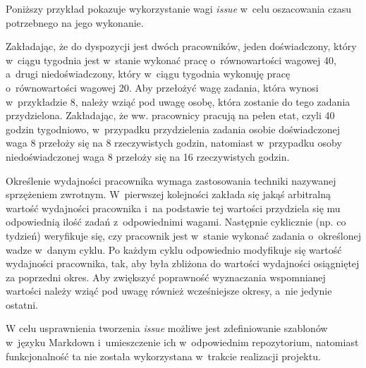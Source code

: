 Poniższy przykład pokazuje wykorzystanie wagi \textit{issue} w~celu oszacowania czasu potrzebnego na jego wykonanie.\par

Zakładając, że do dyspozycji jest dwóch pracowników, jeden doświadczony, który w~ciągu tygodnia jest w~stanie wykonać pracę o~równowartości wagowej 40, a~drugi niedoświadczony, który w~ciągu tygodnia wykonuję pracę o~równowartości wagowej 20. Aby przełożyć wagę zadania, która wynosi w~przykładzie 8, należy wziąć pod uwagę osobę, która zostanie do tego zadania przydzielona. Zakładając, że ww. pracownicy pracują na pełen etat, czyli 40 godzin tygodniowo, w~przypadku przydzielenia zadania osobie doświadczonej waga 8 przełoży się na 8 rzeczywistych godzin, natomiast w~przypadku osoby niedoświadczonej waga 8 przełoży się na 16 rzeczywistych godzin. \par

Określenie wydajności pracownika wymaga zastosowania techniki nazywanej sprzężeniem zwrotnym. W~pierwszej kolejności zakłada się jakąś arbitralną wartość wydajności pracownika i~na podstawie tej wartości przydziela się mu odpowiednią ilość zadań z~odpowiednimi wagami. Następnie cyklicznie (np. co tydzień) weryfikuje się, czy pracownik jest w~stanie wykonać zadania o~określonej wadze w~danym cyklu. Po każdym cyklu odpowiednio modyfikuje się wartość wydajności pracownika, tak, aby była zbliżona do wartości wydajności osiągniętej za poprzedni okres. Aby zwiększyć poprawność wyznaczania wspomnianej wartości należy wziąć pod uwagę również wcześniejsze okresy, a~nie jedynie ostatni.\par

W celu usprawnienia tworzenia \textit{issue} możliwe jest zdefiniowanie szablonów w~języku Markdown i~umieszczenie ich w~odpowiednim repozytorium, natomiast funkcjonalność ta nie została wykorzystana w~trakcie realizacji projektu.

\newpage

